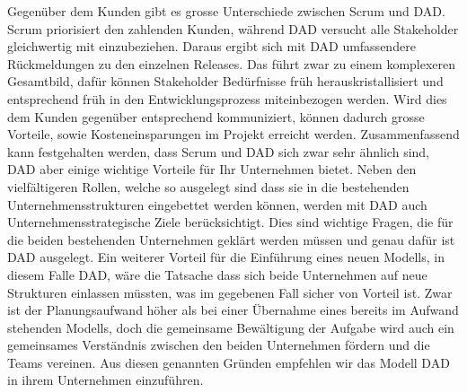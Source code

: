 Gegenüber dem Kunden gibt es grosse Unterschiede zwischen Scrum und DAD. Scrum priorisiert den zahlenden Kunden, während DAD versucht alle Stakeholder gleichwertig mit einzubeziehen. Daraus ergibt sich mit DAD umfassendere Rückmeldungen zu den einzelnen Releases. Das führt zwar zu einem komplexeren Gesamtbild, dafür können Stakeholder Bedürfnisse früh herauskristallisiert und entsprechend früh in den Entwicklungsprozess miteinbezogen werden. Wird dies dem Kunden gegenüber entsprechend kommuniziert, können dadurch grosse Vorteile, sowie Kosteneinsparungen im Projekt erreicht werden. \newline
Zusammenfassend kann festgehalten werden, dass Scrum und DAD sich zwar sehr ähnlich sind, DAD aber einige wichtige Vorteile für Ihr Unternehmen bietet. Neben den vielfältigeren Rollen, welche so ausgelegt sind dass sie in die bestehenden Unternehmensstrukturen eingebettet werden können, werden mit DAD auch Unternehmensstrategische Ziele berücksichtigt. Dies sind wichtige Fragen, die für die beiden bestehenden Unternehmen geklärt werden müssen und genau dafür ist DAD ausgelegt. Ein weiterer Vorteil für die Einführung eines neuen Modells, in diesem Falle DAD, wäre die Tatsache dass sich beide Unternehmen auf neue Strukturen einlassen müssten, was im gegebenen Fall sicher von Vorteil ist. Zwar ist der Planungsaufwand höher als bei einer Übernahme eines bereits im Aufwand stehenden Modells, doch die gemeinsame Bewältigung der Aufgabe wird auch ein gemeinsames Verständnis zwischen den beiden Unternehmen fördern und die Teams vereinen. Aus diesen genannten Gründen empfehlen wir das Modell DAD in ihrem Unternehmen einzuführen.





	